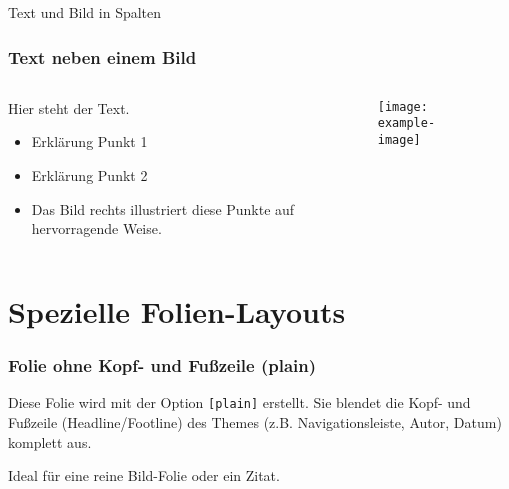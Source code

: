 \documentclass[12pt, aspectratio=169]{beamer}
\begin{document}
\begin{frame}{Text und Bild in Spalten}
    \frametitle{Text neben einem Bild}
    
    \begin{columns}[c] %
        \begin{column}{0.6\textwidth}
            Hier steht der Text.
            \begin{itemize}
                \item Erklärung Punkt 1
                \item Erklärung Punkt 2
                \item Das Bild rechts illustriert diese Punkte auf hervorragende Weise.
            \end{itemize}
        \end{column}
        
        \begin{column}{0.4\textwidth}
            \begin{figure}
                \texttt{[image: example-image]}
            \end{figure}
        \end{column}
    \end{columns}
\end{frame}

\section{Spezielle Folien-Layouts}

\begin{frame}[plain]
    \frametitle{Folie ohne Kopf- und Fußzeile (plain)}
    
    Diese Folie wird mit der Option \texttt{[plain]} erstellt.
    Sie blendet die Kopf- und Fußzeile (Headline/Footline) des Themes 
    (z.B. Navigationsleiste, Autor, Datum) komplett aus.
    
    \vfill
    \begin{center}
    \Huge Ideal für eine reine Bild-Folie oder ein Zitat.
    \end{center}
    \vfill
    
\end{frame}
\end{document}
